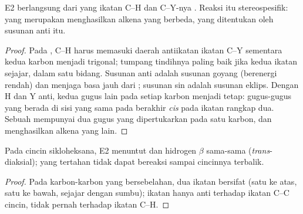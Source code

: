 \begin{proposition}\label{prop:b1:elimination:anti}
E2 berlangsung dari  yang ikatan C--H dan C--Y-nya
. Reaksi itu stereospesifik:  yang
merupakan  menghasilkan  alkena yang berbeda,
yang ditentukan oleh susunan anti itu.
\end{proposition}

\begin{proof}
Pada ,  C--H harus memasuki
daerah antiikatan ikatan C--Y sementara kedua karbon menjadi trigonal;
tumpang tindihnya paling baik jika kedua ikatan sejajar, dalam satu
bidang. Susunan anti adalah susunan goyang (berenergi rendah) dan menjaga
basa jauh dari ; susunan sin adalah susunan eklips. Dengan H
dan Y anti, kedua gugus lain pada setiap karbon menjadi tetap: gugus-gugus
yang berada di sisi yang sama pada  berakhir \textit{cis}
pada ikatan rangkap dua. Sebuah  mempunyai dua gugus yang
dipertukarkan pada satu karbon, dan menghasilkan alkena yang lain.
\end{proof}

\begin{proposition}\label{prop:b1:elimination:cyclohexane-e2}
Pada cincin sikloheksana, E2 menuntut  dan hidrogen $\beta$
sama-sama  (\textit{trans}-diaksial);  yang tertahan
 tidak dapat bereaksi sampai cincinnya terbalik.
\end{proposition}

\begin{proof}
Pada karbon-karbon  yang bersebelahan, dua ikatan  bersifat
 (satu ke atas, satu ke bawah, sejajar dengan sumbu);
ikatan  hanya anti terhadap ikatan C--C cincin, tidak pernah
terhadap ikatan C--H.
\end{proof}

